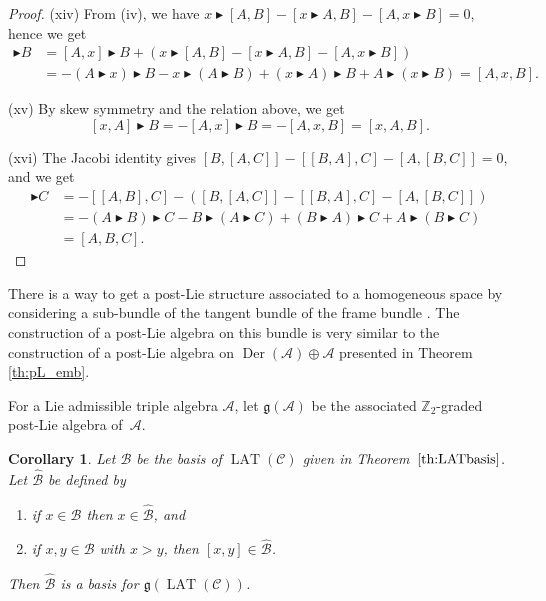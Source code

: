 \documentclass[10pt,a4paper]{amsart}
\newcommand{\Der}{\operatorname{Der}}
\newcommand*{\LAT}{\operatorname{LAT}}
\numberwithin{equation}{section}
\newtheorem{Corollary}[Theorem]{Corollary}
\begin{document}
\begin{proof}
(xiv) From (iv), we have $x \blacktriangleright [A,B] - [x \blacktriangleright A,B] - [A, x\blacktriangleright B] = 0$, hence we get
 \begin{align*}
 [A,x] \blacktriangleright B & = [A, x] \blacktriangleright B + ( x \blacktriangleright [A,B] - [x \blacktriangleright A,B] - [A, x\blacktriangleright B] ) \\
 & = - (A \blacktriangleright x) \blacktriangleright B - x \blacktriangleright (A \blacktriangleright B) + (x \blacktriangleright A) \blacktriangleright B + A \blacktriangleright (x \blacktriangleright B )
 = [A,x,B].
 \end{align*}

(xv) By skew symmetry and the relation above, we get
 \[
 [x,A] \blacktriangleright B = -[A,x] \blacktriangleright B = -[A,x,B] = [x,A,B].
 \]

(xvi) The Jacobi identity gives $[B,[A,C]] - [[B,A],C] - [A,[B,C]]=0$, and we get
 \begin{align*}
 [A,B] \blacktriangleright C &{}= -[[A,B],C] - ( [B,[A,C]] - [[B,A],C] - [A,[B,C]] ) \\
 &{}= - (A\blacktriangleright B ) \blacktriangleright C - B \blacktriangleright ( A \blacktriangleright C) + (B \blacktriangleright A ) \blacktriangleright C + A \blacktriangleright (B \blacktriangleright C) \\
 &{}= [A,B,C].
\tag*{\qed}
\end{align*}
\renewcommand{\qed}{}
\end{proof}


\begin{Remark}
 There is a way to get a post-Lie structure associated to a homogeneous space by considering a sub-bundle of the tangent bundle of the frame bundle \cite{grong_MK_S_2023}. The construction of a post-Lie algebra on this bundle is very similar to the construction of a post-Lie algebra on $\Der(\mathcal{A}) \oplus \mathcal{A}$ presented in Theorem \ref{th:pL_emb}.
\end{Remark}

For a Lie admissible triple algebra $\mathcal{A}$, let $\mathfrak{g}(\mathcal{A})$ be the associated $\mathbb{Z}_2$-graded post-Lie algebra of~$\mathcal{A}$.

\begin{Corollary}
 Let $\mathcal{B}$ be the basis of $\LAT(\mathcal{C})$ given in Theorem~$\ref{th:LATbasis}$. Let $\hat{\mathcal{B}}$ be defined by
 \begin{enumerate}\itemsep=0pt
 \item[$(i)$] if $x\in \mathcal{B}$ then $x \in \hat{\mathcal{B}}$, and
 \item[$(ii)$] if $x,y \in \mathcal{B}$ with $x>y$, then $[x,y] \in \hat{\mathcal{B}}$.
 \end{enumerate}
 Then $\hat{\mathcal{B}}$ is a basis for $\mathfrak{g}(\LAT(\mathcal{C}))$.
\end{Corollary}
\end{document}
